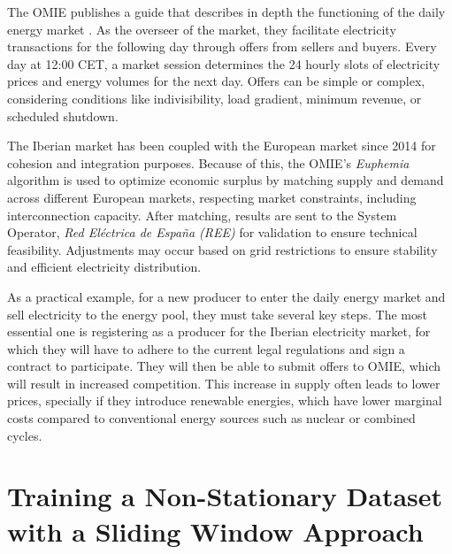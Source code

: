 \documentclass[12pt]{report} %
\begin{document}
The OMIE publishes a guide that describes in depth the functioning of the daily energy market \cite{OMIE_MercadoDiario}. As the overseer of the market, they facilitate electricity transactions for the following day through offers from sellers and buyers. Every day at 12:00 CET, a market session determines the 24 hourly slots of electricity prices and energy volumes for the next day. Offers can be simple or complex, considering conditions like indivisibility, load gradient, minimum revenue, or scheduled shutdown.

The Iberian market has been coupled with the European market since 2014 for cohesion and integration purposes. Because of this, the OMIE's \textit{Euphemia} algorithm is used to optimize economic surplus by matching supply and demand across different European markets, respecting market constraints, including interconnection capacity. After matching, results are sent to the System Operator, \textit{Red Eléctrica de España (REE)} for validation to ensure technical feasibility. Adjustments may occur based on grid restrictions to ensure stability and efficient electricity distribution.

As a practical example, for a new producer to enter the daily energy market and sell electricity to the energy pool, they must take several key steps. The most essential one is registering as a producer for the Iberian electricity market, for which they will have to adhere to the current legal regulations and sign a contract to participate. They will then be able to submit offers to OMIE, which will result in increased competition. This increase in supply often leads to lower prices, specially if they introduce renewable energies, which have lower marginal costs compared to conventional energy sources such as nuclear or combined cycles.


\section{Training a Non-Stationary Dataset with a Sliding Window Approach}
\end{document}
